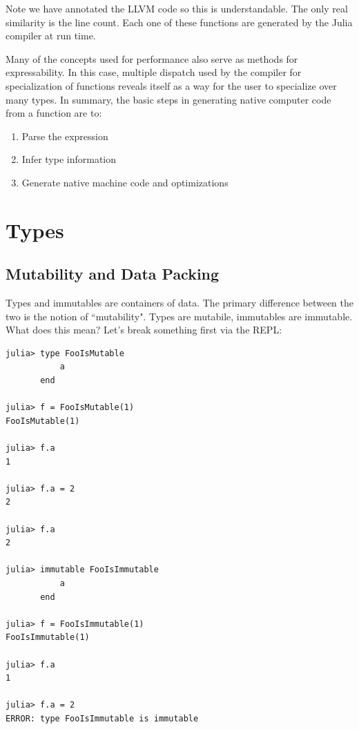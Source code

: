 Note we have annotated the LLVM code so this is understandable. 
The only real similarity is the line count. Each one of these functions are generated by the
Julia compiler at run time.

Many of the concepts used for performance also serve as methods for
expressability. In this case, multiple dispatch used by the compiler for
specialization of functions reveals itself as a way for the user to
specialize over many types. In summary, the
basic steps in generating native computer code from a function are to:
\begin{enumerate}
\item Parse the expression
\item Infer type information
\item Generate native machine code and optimizations
\end{enumerate}

\section{Types}

\subsection{Mutability and Data Packing}
Types and immutables are containers of data. The primary difference between
the two is the notion of ``mutability". Types are mutabile, immutables are 
immutable. What does this mean? Let's break something first via the REPL:
\begin{lstlisting}
julia> type FooIsMutable
           a
       end

julia> f = FooIsMutable(1)
FooIsMutable(1)

julia> f.a
1

julia> f.a = 2
2

julia> f.a
2

julia> immutable FooIsImmutable
           a
       end

julia> f = FooIsImmutable(1)
FooIsImmutable(1)

julia> f.a
1

julia> f.a = 2
ERROR: type FooIsImmutable is immutable
\end{lstlisting}

